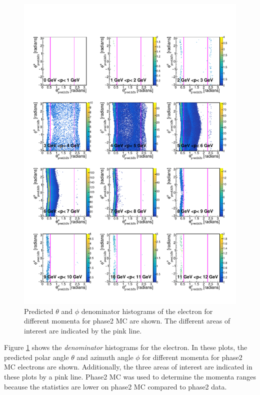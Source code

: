 \documentclass[a4paper,11pt,twosided,final,german,openbib,pdftex,listof=totoc,bibliography=totoc]{scrbook}
\begin{document}
\begin{figure}[h!]
	\includegraphics[width=\textwidth]{Plots/master/RTPMemD_MC.pdf}
	\caption[Denominator $\theta$-$\phi$ Electron Momentum MC]{Predicted $\theta$ and $\phi$ denominator histograms of the electron for different momenta for phase2 MC are shown. The different areas of interest are indicated by the pink line.}
	\label{plt:RTPMemD_MC}
\end{figure}

Figure \ref{plt:RTPMemD_MC} shows the \textit{denominator} histograms for the electron. In these plots, the predicted polar angle $\theta$ and azimuth angle $\phi$ for different momenta for phase2 MC electrons are shown. Additionally, the three areas of interest are indicated in these plots by a pink line. Phase2 MC was used to determine the momenta ranges because the statistics are lower on phase2 MC compared to phase2 data. 
\end{document}
